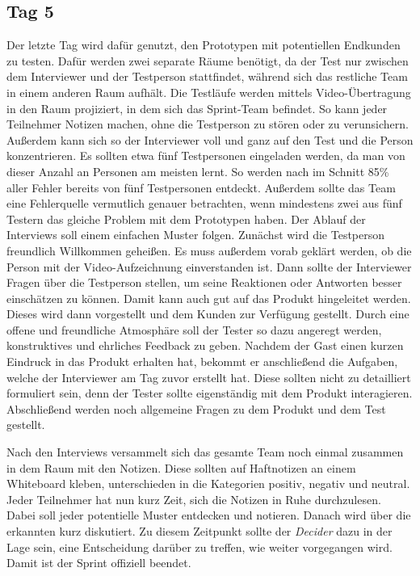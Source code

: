 \subsection*{\label{sec:Sprint-Tag5}\thesubsection\quad Tag 5}
Der letzte Tag wird dafür genutzt, den Prototypen mit potentiellen Endkunden zu testen. Dafür werden zwei separate Räume benötigt, da der Test nur zwischen dem Interviewer und der Testperson stattfindet, während sich das restliche Team in einem anderen Raum aufhält. Die Testläufe werden mittels Video-Übertragung in den Raum projiziert, in dem sich das Sprint-Team befindet. So kann jeder Teilnehmer Notizen machen, ohne die Testperson zu stören oder zu verunsichern. Außerdem kann sich so der Interviewer voll und ganz auf den Test und die Person konzentrieren. Es sollten etwa fünf Testpersonen eingeladen werden, da man von dieser Anzahl an Personen am meisten lernt. So werden nach  im Schnitt 85\% aller Fehler bereits von fünf Testpersonen entdeckt. Außerdem sollte das Team eine Fehlerquelle vermutlich genauer betrachten, wenn mindestens zwei aus fünf Testern das gleiche Problem mit dem Prototypen haben.
Der Ablauf der Interviews soll einem einfachen Muster folgen. Zunächst wird die Testperson freundlich Willkommen geheißen. Es muss außerdem vorab geklärt werden, ob die Person mit der Video-Aufzeichnung einverstanden ist. Dann sollte der Interviewer Fragen über die Testperson stellen, um seine Reaktionen oder Antworten besser einschätzen zu können. Damit kann auch gut auf das Produkt hingeleitet werden. Dieses wird dann vorgestellt und dem Kunden zur Verfügung gestellt. Durch eine offene und freundliche Atmosphäre soll der Tester so dazu angeregt werden, konstruktives und ehrliches Feedback zu geben. Nachdem der Gast einen kurzen Eindruck in das Produkt erhalten hat, bekommt er anschließend die Aufgaben, welche der Interviewer am Tag zuvor erstellt hat. Diese sollten nicht zu detailliert formuliert sein, denn der Tester sollte eigenständig mit dem Produkt interagieren. Abschließend werden noch allgemeine Fragen zu dem Produkt und dem Test gestellt.

Nach den Interviews versammelt sich das gesamte Team noch einmal zusammen in dem Raum mit den Notizen. Diese sollten auf Haftnotizen an einem Whiteboard kleben, unterschieden in die Kategorien positiv, negativ und neutral. Jeder Teilnehmer hat nun kurz Zeit, sich die Notizen in Ruhe durchzulesen. Dabei soll jeder potentielle Muster entdecken und notieren. Danach wird über die erkannten kurz diskutiert. Zu diesem Zeitpunkt sollte der \textit{Decider} dazu in der Lage sein, eine Entscheidung darüber zu treffen, wie weiter vorgegangen wird. Damit ist der Sprint offiziell beendet.

